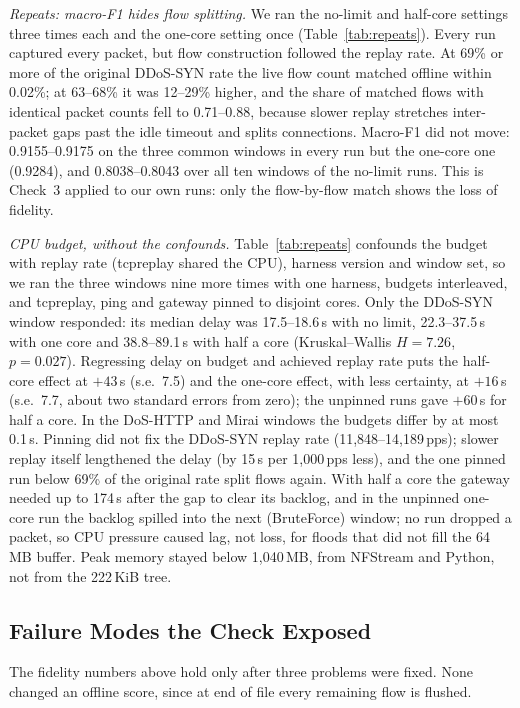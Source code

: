 \emph{Repeats: macro-F1 hides flow splitting.} We ran the no-limit and half-core settings three times each and the one-core setting once (Table~\ref{tab:repeats}). Every run captured every packet, but flow construction followed the replay rate. At 69\% or more of the original DDoS-SYN rate the live flow count matched offline within 0.02\%; at 63--68\% it was 12--29\% higher, and the share of matched flows with identical packet counts fell to 0.71--0.88, because slower replay stretches inter-packet gaps past the idle timeout and splits connections. Macro-F1 did not move: 0.9155--0.9175 on the three common windows in every run but the one-core one (0.9284), and 0.8038--0.8043 over all ten windows of the no-limit runs. This is Check~3 applied to our own runs: only the flow-by-flow match shows the loss of fidelity.

\emph{CPU budget, without the confounds.} Table~\ref{tab:repeats} confounds the budget with replay rate (tcpreplay shared the CPU), harness version and window set, so we ran the three windows nine more times with one harness, budgets interleaved, and tcpreplay, ping and gateway pinned to disjoint cores. Only the DDoS-SYN window responded: its median delay was 17.5--18.6\,s with no limit, 22.3--37.5\,s with one core and 38.8--89.1\,s with half a core (Kruskal--Wallis $H=7.26$, $p=0.027$). Regressing delay on budget and achieved replay rate puts the half-core effect at $+43$\,s (s.e.\ 7.5) and the one-core effect, with less certainty, at $+16$\,s (s.e.\ 7.7, about two standard errors from zero); the unpinned runs gave $+60$\,s for half a core. In the DoS-HTTP and Mirai windows the budgets differ by at most 0.1\,s. Pinning did not fix the DDoS-SYN replay rate (11,848--14,189\,pps); slower replay itself lengthened the delay (by 15\,s per 1,000\,pps less), and the one pinned run below 69\% of the original rate split flows again. With half a core the gateway needed up to 174\,s after the gap to clear its backlog, and in the unpinned one-core run the backlog spilled into the next (BruteForce) window; no run dropped a packet, so CPU pressure caused lag, not loss, for floods that did not fill the 64\,MB buffer. Peak memory stayed below 1,040\,MB, from NFStream and Python, not from the 222\,KiB tree.

\subsection{Failure Modes the Check Exposed}\label{sec:defect}

The fidelity numbers above hold only after three problems were fixed. None changed an offline score, since at end of file every remaining flow is flushed.

